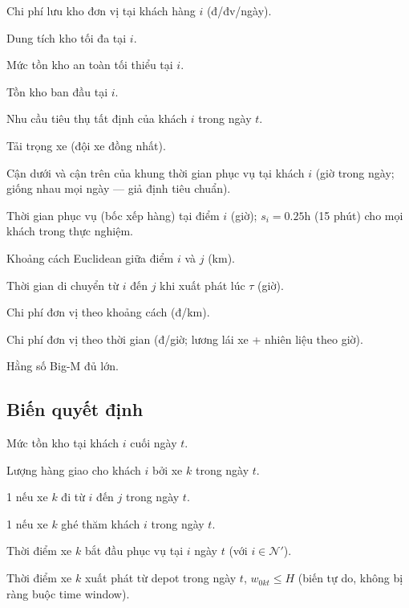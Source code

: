 \documentclass[12pt,a4paper]{article}
\newcommand{\N}{\mathcal{N}}
\newcommand{\tij}{\tau_{ij}}
\begin{document}
\begin{description}[leftmargin=4cm, labelwidth=3.5cm, font=\normalfont\itshape]
  \item[$h_i$] Chi phí lưu kho đơn vị tại khách hàng $i$ (đ/đv/ngày).
  \item[$U_i$] Dung tích kho tối đa tại $i$.
  \item[$L_i^{\min}$] Mức tồn kho an toàn tối thiểu tại $i$.
  \item[$I_{i0}$] Tồn kho ban đầu tại $i$.
  \item[$d_{it}$] Nhu cầu tiêu thụ tất định của khách $i$ trong ngày $t$.
  \item[$Q$] Tải trọng xe (đội xe đồng nhất).
  \item[$e_i,\ l_i$] Cận dưới và cận trên của khung thời gian phục vụ tại khách $i$
                      (giờ trong ngày; giống nhau mọi ngày --- giả định tiêu chuẩn).
  \item[$s_i$] Thời gian phục vụ (bốc xếp hàng) tại điểm $i$ (giờ); $s_i = 0.25$h
               (15 phút) cho mọi khách trong thực nghiệm.
  \item[$d_{ij}$] Khoảng cách Euclidean giữa điểm $i$ và $j$ (km).
  \item[$\tij(\tau)$] Thời gian di chuyển từ $i$ đến $j$ khi xuất phát lúc $\tau$ (giờ).
  \item[$c_d$] Chi phí đơn vị theo khoảng cách (đ/km).
  \item[$c_t$] Chi phí đơn vị theo thời gian (đ/giờ; lương lái xe + nhiên liệu theo giờ).
  \item[$M$] Hằng số Big-M đủ lớn.
\end{description}

\subsection{Biến quyết định}

\begin{description}[leftmargin=4cm, labelwidth=3.5cm, font=\normalfont\itshape]
  \item[$I_{it} \geq 0$] Mức tồn kho tại khách $i$ cuối ngày $t$.
  \item[$q_{ikt} \geq 0$] Lượng hàng giao cho khách $i$ bởi xe $k$ trong ngày $t$.
  \item[$x_{ijkt} \in \{0,1\}$] 1 nếu xe $k$ đi từ $i$ đến $j$ trong ngày $t$.
  \item[$z_{ikt} \in \{0,1\}$] 1 nếu xe $k$ ghé thăm khách $i$ trong ngày $t$.
  \item[$w_{ikt} \geq 0$] Thời điểm xe $k$ bắt đầu phục vụ tại $i$ ngày $t$
                           (với $i \in \N'$).
  \item[$w_{0kt} \geq 0$] Thời điểm xe $k$ xuất phát từ depot trong ngày $t$,
                           $w_{0kt} \leq H$ (biến tự do, không bị ràng buộc time window).
\end{description}
\end{document}
